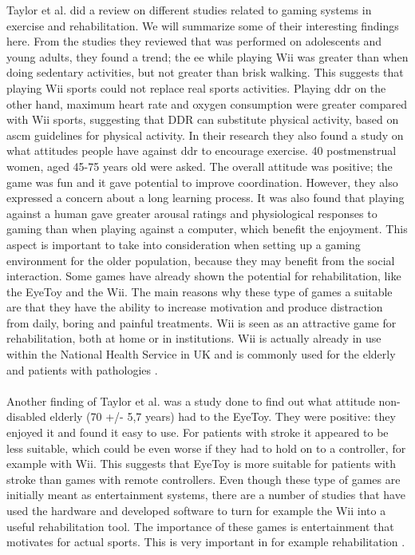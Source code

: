 Taylor et al. \cite{taylor2011activity} did a review on different studies related to gaming systems in exercise and rehabilitation. We will summarize some of their interesting findings here. From the studies they reviewed that was performed on adolescents and young adults, they found a trend; the  \ac{ee} while playing Wii was greater than when doing sedentary activities, but not greater than brisk walking. This suggests that playing Wii sports could not replace real sports activities. Playing \ac{ddr} on the other hand, maximum heart rate and oxygen consumption were greater compared with Wii sports, suggesting that DDR can substitute physical activity, based on \ac{ascm} guidelines for physical activity. In their research they also found a study on what attitudes people have against \ac{ddr} to encourage exercise. 40 postmenstrual women, aged 45-75 years old were asked. The overall attitude was positive; the game was fun and it gave potential to improve coordination. However, they also expressed a concern about a long learning process. It was also found that playing against a human gave greater arousal ratings and physiological responses to gaming than when playing against a computer, which benefit the enjoyment. This aspect is important to take into consideration when setting up a gaming environment for the older population, because they may benefit from the social interaction. Some games have already shown the potential for rehabilitation, like the EyeToy and the Wii. The main reasons why these type of games a suitable are that they have the ability to increase motivation and produce distraction from daily, boring and painful treatments. Wii is seen as an attractive game for rehabilitation, both at home or in institutions. Wii is actually already in use within the National Health Service in UK and is commonly used for the elderly and patients with pathologies  \cite{taylor2011activity}. \\ \\
Another finding of Taylor et al. was a study done to find out what attitude non-disabled elderly (70 +/- 5,7 years) had to the EyeToy. They were positive: they enjoyed it and found it easy to use. For patients with stroke it appeared to be less suitable, which could be even worse if they had to hold on to a controller, for example with Wii. This suggests that EyeToy is more suitable for patients with stroke than games with remote controllers.  
Even though these type of games are initially meant as entertainment systems, there are a number of studies that have used the hardware and developed software to turn for example the Wii into a useful rehabilitation tool. The importance of these games is entertainment that motivates for actual sports. This is very important in for example rehabilitation \cite{taylor2011activity}. \\ \\

